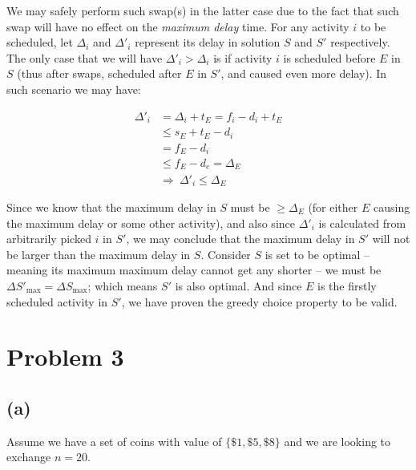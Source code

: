 \documentclass[11pt]{article}
\begin{document}
We may safely perform such swap(s) in the latter case due to the fact that such swap will have no effect on the \textit{maximum delay} time. For any activity $i$ to be scheduled, let $\Delta_i$ and $\Delta'_i$ represent its delay in solution $S$ and $S'$ respectively. The only case that we will have $\Delta'_i > \Delta_i$ is if activity $i$ is scheduled before $E$ in $S$ (thus after swaps, scheduled after $E$ in $S'$, and caused even more delay). In such scenario we may have:

\begin{align*}
    \Delta'_i &= \Delta_i + t_E = f_i - d_i + t_E \\
    &\leq s_E + t_E - d_i \\
    &= f_E - d_i \\
    &\leq f_E - d_e = \Delta_E \\
    &\Longrightarrow \ \Delta'_i \leq \Delta_E
\end{align*}

Since we know that the maximum delay in $S$ must be $\geq \Delta_E$ (for either $E$ causing the maximum delay or some other activity), and also since $\Delta'_i$ is calculated from arbitrarily picked $i$ in $S'$, we may conclude that the maximum delay in $S'$ will not be larger than the maximum delay in $S$. Consider $S$ is set to be optimal -- meaning its maximum maximum delay cannot get any shorter -- we must be $\Delta S'_{\text{max}} = \Delta S_{\text{max}}$; which means $S'$ is also optimal. And since $E$ is the firstly scheduled activity in $S'$, we have proven the greedy choice property to be valid.

\section{Problem 3}

\subsection{(a)}

Assume we have a set of coins with value of $\{\$1, \$5, \$8\}$ and we are looking to exchange $n = 20$.\newline
\end{document}
